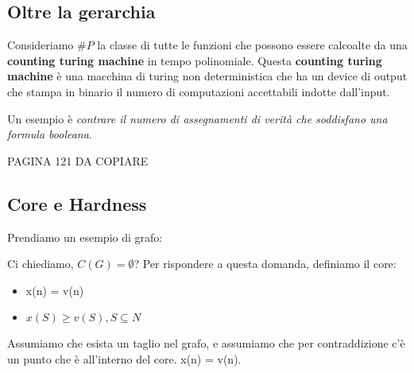 \subsection{Oltre la gerarchia}
Consideriamo $\#P$ la classe di tutte le funzioni che possono essere calcoalte
da una \textbf{counting turing machine} in tempo polinomiale. Questa
\textbf{counting turing machine} è una macchina di turing non deterministica
che ha un device di output che stampa in binario il numero di computazioni
accettabili indotte dall'input.

Un esempio è \textit{contrare il numero di assegnamenti di verità che
    soddisfano una formula booleana}.

PAGINA 121 DA COPIARE

\subsection{Core e Hardness}

Prendiamo un esempio di grafo:
\begin{figure}[H]
    \begin{center}
    \end{center}
\end{figure}

Ci chiediamo, \textbf{$C(G) = \emptyset$}? Per rispondere a questa domanda,
definiamo il core:
\begin{itemize}
    \item x(n) = v(n)
    \item $x(S) \geq v(S), S \subseteq N$
\end{itemize}
Assumiamo che esista un taglio nel grafo, e assumiamo che per contraddizione c'è un punto che è all'interno del core.
x(n) = v(n).

